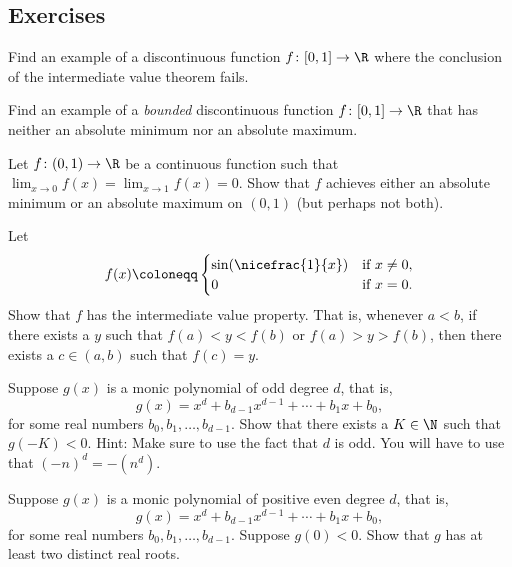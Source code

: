 \subsection{Exercises}

\begin{exercise}
Find an example of a discontinuous function $f \colon [0,1] \to \R$
where the conclusion of the intermediate value theorem fails.
\end{exercise}

\begin{exercise}
Find an example of a \emph{bounded} discontinuous function $f \colon [0,1]
\to \R$ that has neither an absolute minimum nor an absolute maximum.
\end{exercise}

\begin{exercise}
Let $f \colon (0,1) \to \R$ be a continuous function such that
$\displaystyle \lim_{x\to 0} f(x) =
\displaystyle \lim_{x\to 1} f(x) = 0$.  Show that
$f$ achieves either an absolute minimum or an absolute maximum on $(0,1)$
(but perhaps not both).
\end{exercise}

\begin{exercise} \label{exercise:meanvaluepropsin1x}
Let
\begin{equation*}
f(x) \coloneqq
\begin{cases}
\sin(\nicefrac{1}{x}) & \text{if } x \not= 0, \\
0 & \text{if } x=0.
\end{cases}
\end{equation*}
Show that $f$ has the intermediate value property.
That is, whenever $a < b$, if there exists a $y$ such that $f(a) < y < f(b)$
or $f(a) > y > f(b)$, then
there exists a $c \in (a,b)$ such that $f(c) = y$.
\end{exercise}

\begin{exercise} \label{exercise:odddegnegativeK}
Suppose $g(x)$ is a monic polynomial of odd degree $d$, that is,
\begin{equation*}
g(x) = x^d + b_{d-1} x^{d-1} + \cdots + b_1 x + b_0 ,
\end{equation*}
for some real numbers $b_{0}, b_1, \ldots, b_{d-1}$.  Show that there exists
a $K \in \N$ such that $g(-K) < 0$.  Hint: Make sure to use the fact that
$d$ is odd.  You will have to use that ${(-n)}^d = -(n^d)$.
\end{exercise}

\begin{exercise}
Suppose $g(x)$ is a monic polynomial of positive even degree $d$, that is,
\begin{equation*}
g(x) = x^d + b_{d-1} x^{d-1} + \cdots + b_1 x + b_0 ,
\end{equation*}
for some real numbers $b_{0}, b_1, \ldots, b_{d-1}$.  Suppose 
$g(0) < 0$.  Show that $g$ has at least two distinct real roots.
\end{exercise}

